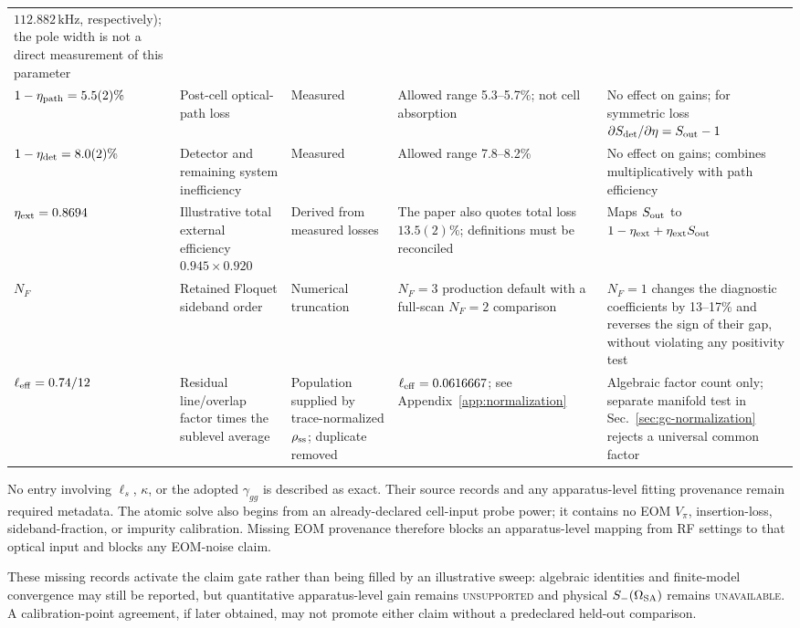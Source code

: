 \documentclass[11pt,a4paper]{article}
\newcommand{\kHz}{\,\mathrm{kHz}}
\begin{document}
\begin{longtable}{L{2.8cm}L{3.4cm}L{2.5cm}L{3.4cm}L{3.4cm}}
$112.882\kHz$, respectively);
the pole width is not a direct measurement of this parameter\\
$1-\eta_{\rm path}=5.5(2)\%$ &
Post-cell optical-path loss &
Measured \cite{Sim2025} &
Allowed range 5.3--5.7\%; not cell absorption &
No effect on gains; for symmetric loss
$\partial S_{\rm det}/\partial\eta=S_{\rm out}-1$\\
$1-\eta_{\rm det}=8.0(2)\%$ &
Detector and remaining system inefficiency &
Measured \cite{Sim2025} &
Allowed range 7.8--8.2\% &
No effect on gains; combines multiplicatively with path efficiency\\
$\eta_{\rm ext}=0.8694$ &
Illustrative total external efficiency
$0.945\times0.920$ &
Derived from measured losses &
The paper also quotes total loss $13.5(2)\%$; definitions must be reconciled &
Maps $S_{\rm out}$ to $1-\eta_{\rm ext}+\eta_{\rm ext}S_{\rm out}$\\
$N_F$ &
Retained Floquet sideband order &
Numerical truncation &
$N_F=3$ production default with a full-scan $N_F=2$ comparison &
$N_F=1$ changes the diagnostic coefficients by 13--17\% and reverses the sign
of their gap, without
violating any positivity test\\
$\ell_{\rm eff}=0.74/12$ &
Residual line/overlap factor times the sublevel average &
Population supplied by trace-normalized $\rho_{\rm ss}$; duplicate removed &
$\ell_{\rm eff}=0.0616667$; see Appendix~\ref{app:normalization} &
Algebraic factor count only; separate manifold test in Sec.~\ref{sec:gc-normalization} rejects a universal common factor\\
\end{longtable}
\endgroup

No entry involving $\ell_s$, $\kappa$, or the adopted $\gamma_{gg}$ is
described as exact. Their source records and any apparatus-level fitting
provenance remain required metadata.
The atomic solve also begins from an already-declared cell-input probe power;
it contains no EOM $V_\pi$, insertion-loss, sideband-fraction, or impurity
calibration. Missing EOM provenance therefore blocks an apparatus-level mapping
from RF settings to that optical input and blocks any EOM-noise claim.

These missing records activate the claim gate rather than being filled by an
illustrative sweep: algebraic identities and finite-model convergence may still
be reported, but quantitative apparatus-level gain remains
\textsc{unsupported} and physical $S_-(\Omega_{\rm SA})$ remains
\textsc{unavailable}. A calibration-point agreement, if later obtained, may not
promote either claim without a predeclared held-out comparison.
\end{document}
